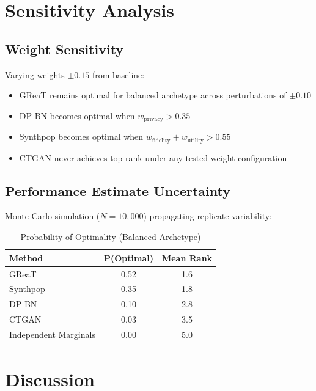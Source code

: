 \documentclass[12pt,a4paper]{article}
\begin{document}
\section{Sensitivity Analysis}

\subsection{Weight Sensitivity}

Varying weights $\pm 0.15$ from baseline:
\begin{itemize}
    \item GReaT remains optimal for balanced archetype across perturbations of $\pm 0.10$
    \item DP BN becomes optimal when $w_{\text{privacy}} > 0.35$
    \item Synthpop becomes optimal when $w_{\text{fidelity}} + w_{\text{utility}} > 0.55$
    \item CTGAN never achieves top rank under any tested weight configuration
\end{itemize}

\subsection{Performance Estimate Uncertainty}

Monte Carlo simulation ($N = 10{,}000$) propagating replicate variability:

\begin{table}[htbp]
\centering
\caption{Probability of Optimality (Balanced Archetype)}
\label{tab:optimality}
\begin{tabular}{@{}lcc@{}}
\toprule
\textbf{Method} & \textbf{P(Optimal)} & \textbf{Mean Rank} \\
\midrule
GReaT & 0.52 & 1.6 \\
Synthpop & 0.35 & 1.8 \\
DP BN & 0.10 & 2.8 \\
CTGAN & 0.03 & 3.5 \\
Independent Marginals & 0.00 & 5.0 \\
\bottomrule
\end{tabular}
\end{table}

\section{Discussion}
\end{document}
